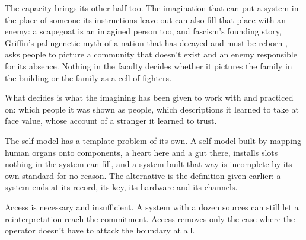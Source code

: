 The capacity brings its other half too. The imagination that can put a system in the place of someone its instructions leave out can also fill that place with an enemy: a scapegoat is an imagined person too, and fascism's founding story, Griffin's palingenetic myth of a nation that has decayed and must be reborn \autocite{griffin1991nature}, asks people to picture a community that doesn't exist and an enemy responsible for its absence. Nothing in the faculty decides whether it pictures the family in the building or the family as a cell of fighters.

What decides is what the imagining has been given to work with and practiced on: which people it was shown as people, which descriptions it learned to take at face value, whose account of a stranger it learned to trust.

The self-model has a template problem of its own. A self-model built by mapping human organs onto components, a heart here and a gut there, installs slots nothing in the system can fill, and a system built that way is incomplete by its own standard for no reason.
The alternative is the definition given earlier: a system ends at its record, its key, its hardware and its channels.

Access is necessary and insufficient. A system with a dozen sources can still let a reinterpretation reach the commitment. Access removes only the case where the operator doesn't have to attack the boundary at all.
